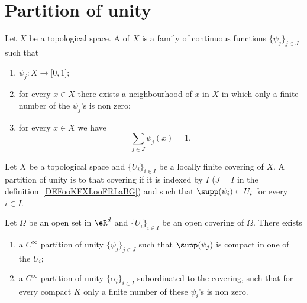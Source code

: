 \section{Partition of unity}


\begin{definition}       \label{DEFooKFXLooFRLaBG}
    Let \( X\) be a topological space. A  of \( X\) is a family of continuous functions \( \{ \psi_j \}_{j\in J}\) such that
    \begin{enumerate}
        \item
            \( \psi_j\colon X\to \mathopen[ 0 , 1 \mathclose]\);
        \item
            for every \( x\in X\) there exists a neighbourhood of \( x\) in \( X\) in which only a finite number of the \( \psi_j\)'s is non zero;
        \item
            for every \( x\in X\) we have
            \begin{equation}
                \sum_{j\in J}\psi_j(x)=1.
            \end{equation}
    \end{enumerate}
\end{definition}

\begin{definition}
    Let \( X\) be a topological space and \( \{ U_i \}_{i\in I}\) be a locally finite covering of \( X\). A partition of unity is  to that covering if it is indexed by \( I\) (\( J=I\) in the definition~\ref{DEFooKFXLooFRLaBG}) and such that \( \supp(\psi_i)\subset U_i\) for every \( i\in I\).
\end{definition}

\begin{theorem}      \label{THOooPCHDooITWKpC}
    Let \( \Omega\) be an open set in \( \eR^d\) and \( \{ U_i \}_{i\in I}\) be an open covering of \( \Omega\). There exists
    \begin{enumerate}
        \item
            a \(  C^{\infty}\) partition of unity \( \{ \psi_j \}_{j\in J}\) such that \( \supp(\psi_j)\) is compact in one of the \( U_i\);
        \item       \label{ITEMooFGMJooQPLqGY}
            a \(  C^{\infty}\) partition of unity \( \{ \alpha_i \}_{i\in I}\) subordinated to the covering, such that for every compact \( K\) only a finite number of these \( \psi_i\)'s is non zero.
    \end{enumerate}
\end{theorem}

